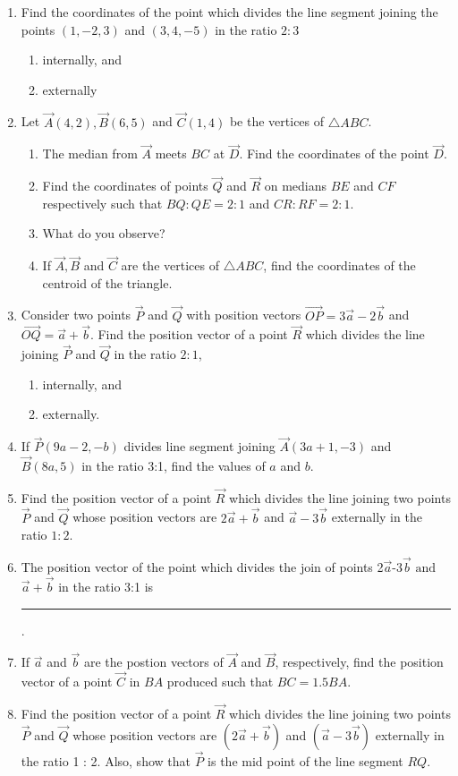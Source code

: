 \begin{enumerate}[label=\thesubsection.\arabic*,ref=\thesubsection.\theenumi]
\begin{enumerate}
\end{enumerate}
\item Find the coordinates of the point which divides the line segment joining the points $(1,-2,3)$ and $(3,4,-5)$ in the ratio $2:3$
\begin{enumerate}
\item internally, and
\item externally
\end{enumerate}
\item Let $\vec{A}(4, 2), \vec{B}(6, 5)$  and $ \vec{C}(1, 4)$ be the vertices of $\triangle ABC$.
\begin{enumerate}
\item The median from $\vec{A}$ meets $BC$ at $\vec{D}$. Find the coordinates of the point $\vec{D}$.
\item Find the coordinates of points $\vec{Q}$ and $\vec{R}$ on medians $BE$ and $CF$ respectively such that $BQ : QE = 2 : 1$  and  $CR : RF = 2 : 1$.
\item What do you observe?
\item If $\vec{A}, \vec{B}$ and $\vec{C}$  are the vertices of $\triangle ABC$, find the coordinates of the centroid of the triangle.
\end{enumerate}
\solution
	
\item Consider two points $\vec{P}$ and $\vec{Q}$ with position vectors $\overrightarrow{OP} = 3\overrightarrow{a}-2\overrightarrow{b}$ and $\overrightarrow{OQ}=\overrightarrow{a}+\overrightarrow{b}$. Find the position vector of a point $\vec{R}$ which divides the line joining $\vec{P}$ and $\vec{Q}$ in the ratio $2:1$, 
\begin{enumerate}
\item internally, and 
\item externally.
\end{enumerate}
\item If $\vec{P}(9a-2,-b)$ divides line segment joining $\vec{A}(3a+1,-3)$ and $\vec{B}(8a,5)$ in the ratio 3:1, find the values of $a$ and $b$.
\item Find the position vector of a point $\vec{R}$ which divides the line joining two points $\vec{P}$ and $\vec{Q}$ whose position vectors are $2\vec{a}+\vec{b}$ and $\vec{a}-3\vec{b}$ externally in the ratio $1:2$.
\item The position vector of the point which divides the join of points 2$\vec{a}$-3$\vec{b}$ $\text{and}$ $\vec{a}+\vec{b}$ in the ratio 3:1 is \rule{1cm}{0.1pt}.
\item If $\vec{a}$ and $\vec{b}$ are the postion vectors of $\vec{A}$ and $\vec{B}$, respectively, find the position vector of a point $\vec{C}$ in $BA$ produced such that $BC=1.5BA$.
\item Find the position vector of a point $\vec{R}$ which divides the line joining two points $\vec{P}$ and $\vec{Q}$ whose position vectors are $(2\vec{a}+\vec{b})$ and $(\vec{a}-3\vec{b})$
externally in the ratio 1 : 2. Also, show that $\vec{P}$ is the mid point of the line segment $RQ$.
\end{enumerate}
